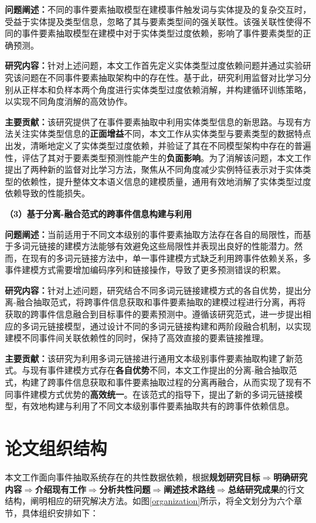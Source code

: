 \textbf{问题阐述：}不同的事件要素抽取模型在建模事件触发词与实体提及的复杂交互时，受益于实体提及类型信息，忽略了其与要素类型间的强关联性。该强关联性使得不同的事件要素抽取模型在建模中对于实体类型过度依赖，影响了事件要素类型的正确预测。

\textbf{研究内容：}针对上述问题，本文工作首先定义实体类型过度依赖问题并通过实验研究该问题在不同事件要素抽取架构中的存在性。基于此，研究利用监督对比学习分别从正样本和负样本两个角度进行实体类型过度依赖消解，并构建循环训练策略，以实现不同角度消解的高效协作。

\textbf{主要贡献：}该研究提供了在事件要素抽取中利用实体类型信息的新思路。与现有方法关注实体类型信息的\textbf{正面增益}不同，本文工作从实体类型与要素类型的数据特点出发，清晰地定义了实体类型过度依赖，并验证了其在不同模型架构中存在的普遍性，评估了其对于要素类型预测性能产生的\textbf{负面影响}。为了消解该问题，本文工作提出了两种新的监督对比学习方法，聚焦从不同角度减少实例特征表示对于实体类型的依赖性，提升整体文本语义信息的建模质量，通用有效地消解了实体类型过度依赖导致的性能损失。

\textbf{（3）基于分离-融合范式的跨事件信息构建与利用}

\textbf{问题阐述：}当前适用于不同文本级别的事件要素抽取方法存在各自的局限性，而基于多词元链接的建模方法能够有效避免这些局限性并表现出良好的性能潜力。然而，在现有的多词元链接方法中，单一事件建模方式缺乏利用跨事件依赖关系，多事件建模方式需要增加编码序列和链接操作，导致了更多预测错误的积累。

\textbf{研究内容：}针对上述问题，研究结合不同多词元链接建模方式的各自优势，提出分离-融合抽取范式，将跨事件信息获取和事件要素抽取的建模过程进行分离，再将获取的跨事件信息融合到目标事件的要素预测中。遵循该研究范式，进一步提出相应的多词元链接模型，通过设计不同的多词元链接构建和两阶段融合机制，以实现建模不同事件间关联依赖性的同时，保持了高效直接的要素链接推理。

\textbf{主要贡献：}该研究为利用多词元链接进行通用文本级别事件要素抽取构建了新范式。与现有事件建模方式存在\textbf{各自优势}不同，本文工作提出的分离-融合抽取范式，构建了跨事件信息获取和事件要素抽取过程的分离再融合，从而实现了现有不同事件建模方式优势的\textbf{高效统一}。在该范式的指导下，提出了新的多词元链接模型，有效地构建与利用了不同文本级别事件要素抽取共有的跨事件依赖信息。

\section{论文组织结构}

本文工作面向事件抽取系统存在的共性数据依赖，根据\textbf{规划研究目标$\Rightarrow$明确研究内容$\Rightarrow$介绍现有工作$\Rightarrow$分析共性问题$\Rightarrow$阐述技术路线$\Rightarrow$总结研究成果}的行文结构，阐明相应的研究解决方法。如图\ref{organization}所示，将全文划分为六个章节，具体组织安排如下：

